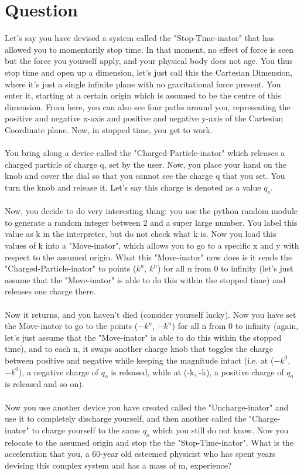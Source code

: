 \section{Question}
Let's say you have devised a system called the "Stop-Time-inator" that has allowed you to momentarily stop time. In that moment, no effect of force is seen but the force you yourself apply, and your physical body does not age. You thus stop time and open up a dimension, let's just call this the Cartesian Dimension, where it's just a single infinite plane with no gravitational force present. You enter it, starting at a certain origin which is assumed to be the centre of this dimension. From here, you can also see four paths around you, representing the positive and negative x-axis and positive and negative y-axis of the Cartesian Coordinate plane. Now, in stopped time, you get to work.
\\
\\
You bring along a device called the "Charged-Particle-inator" which releases a charged particle of charge q, set by the user. Now, you place your hand on the knob and cover the dial so that you cannot see the charge q that you set. You turn the knob and release it. Let's say this charge is denoted as a value $q_o$.
\\
\\
Now, you decide to do very interesting thing: you use the python random module to generate a random integer between 2 and a super large number. You label this value as k in the interpreter, but do not check what k is. Now you load this values of k into a "Move-inator", which allows you to go to a specific x and y with respect to the assumed origin. What this "Move-inator" now does is it sends the "Charged-Particle-inator" to points ($k^n$, $k^n$) for all n from 0 to infinity (let's just assume that the "Move-inator" is able to do this within the stopped time) and releases one charge there.
\\
\\
Now it returns, and you haven't died (consider yourself lucky). Now you have set the Move-inator to go to the points ($-k^n$, $-k^n$) for all n from 0 to infinity (again, let's just assume that the "Move-inator" is able to do this within the stopped time), and to each n, it swaps another charge knob that toggles the charge between positive and negative while keeping the magnitude intact (i.e. at ($-k^0$, $-k^0$), a negative charge of $q_o$ is released, while at (-k, -k), a positive charge of $q_o$ is released and so on). 
\\
\\
Now you use another device you have created called the "Uncharge-inator" and use it to completely discharge yourself, and then another called the "Charge-inator" to charge yourself to the same $q_o$ which you still do not know. Now you relocate to the assumed origin and stop the the "Stop-Time-inator". What is the acceleration that you, a 60-year old esteemed physicist who has spent years devising this complex system and has a mass of m, experience?


